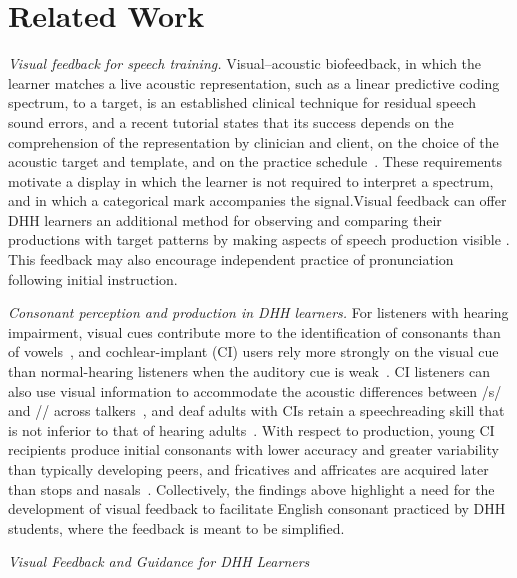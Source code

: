 \documentclass[conference]{IEEEtran}
\newcommand{\ipa}[1]{/#1/}
\begin{document}
\section{Related Work}
\textit{Visual feedback for speech training.} Visual--acoustic biofeedback, in which the learner matches a live acoustic representation, such as a linear predictive coding spectrum, to a target, is an established clinical technique for residual speech sound errors, and a recent tutorial states that its success depends on the comprehension of the representation by clinician and client, on the choice of the acoustic target and template, and on the practice schedule~\cite{hitchcock2023}. These requirements motivate a display in which the learner is not required to interpret a spectrum, and in which a categorical mark accompanies the signal.Visual feedback can offer DHH learners an additional method for observing and comparing their productions with target patterns by making aspects of speech production visible \cite{hitchcock2023}. This feedback may also encourage independent practice of pronunciation \cite{ertmermaki2000} following initial instruction. 

\textit{Consonant perception and production in DHH learners.} For listeners with hearing impairment, visual cues contribute more to the identification of consonants than of vowels~\cite{moradi2017}, and cochlear-implant (CI) users rely more strongly on the visual cue than normal-hearing listeners when the auditory cue is weak~\cite{desai2008}. CI listeners can also use visual information to accommodate the acoustic differences between \ipa{s} and \ipa{\textesh} across talkers~\cite{winn2013}, and deaf adults with CIs retain a speechreading skill that is not inferior to that of hearing adults~\cite{pimperton2017}. With respect to production, young CI recipients produce initial consonants with lower accuracy and greater variability than typically developing peers, and fricatives and affricates are acquired later than stops and nasals~\cite{ertmer2011}. Collectively, the findings above highlight a need for the development of visual feedback to facilitate English consonant practiced  by DHH students, where the feedback is meant to be simplified.

\textit{Visual Feedback and Guidance for DHH Learners} 
\end{document}
